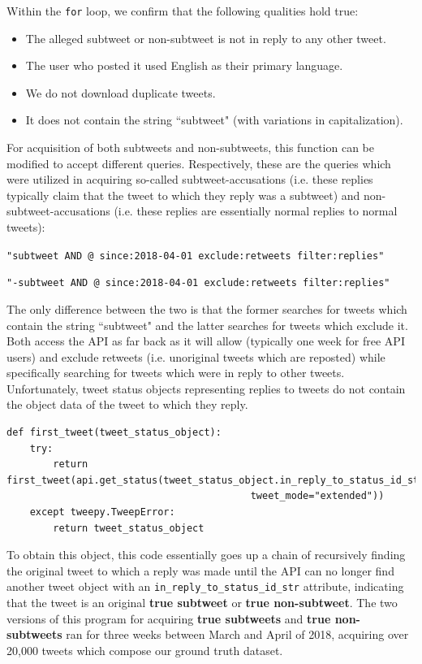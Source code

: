 \documentclass[11pt, twoside, reqno]{book}
\begin{document}
\noindent
Within the \verb|for| loop, we confirm that the following qualities hold true:
\begin{itemize}
	\item The alleged subtweet or non-subtweet is not in reply to any other tweet.
	\item The user who posted it used English as their primary language.
	\item We do not download duplicate tweets.
	\item It does not contain the string ``subtweet" (with variations in capitalization).
\end{itemize}
\noindent
For acquisition of both subtweets and non-subtweets, this function can be modified to accept different queries. Respectively, these are the queries which were utilized in acquiring so-called subtweet-accusations (i.e. these replies typically claim that the tweet to which they reply was a subtweet) and non-subtweet-accusations (i.e. these replies are essentially normal replies to normal tweets):

\verb|"subtweet AND @ since:2018-04-01 exclude:retweets filter:replies"|

\verb|"-subtweet AND @ since:2018-04-01 exclude:retweets filter:replies"|

\noindent
The only difference between the two is that the former searches for tweets which contain the string ``subtweet" and the latter searches for tweets which exclude it. Both access the API as far back as it will allow (typically one week for free API users) and exclude retweets (i.e. unoriginal tweets which are reposted) while specifically searching for tweets which were in reply to other tweets. Unfortunately, tweet status objects representing replies to tweets do not contain the object data of the tweet to which they reply.

\begin{verbatim}
def first_tweet(tweet_status_object):
    try:
        return first_tweet(api.get_status(tweet_status_object.in_reply_to_status_id_str, 
                                          tweet_mode="extended"))
    except tweepy.TweepError:
        return tweet_status_object
\end{verbatim}

\noindent
To obtain this object, this code essentially goes up a chain of recursively finding the original tweet to which a reply was made until the API can no longer find another tweet object with an \verb|in_reply_to_status_id_str| attribute, indicating that the tweet is an original \textbf{true subtweet} or \textbf{true non-subtweet}. The two versions of this program for acquiring \textbf{true subtweets} and \textbf{true non-subtweets} ran for three weeks between March and April of 2018, acquiring over 20,000 tweets which compose our ground truth dataset. 
\end{document}
